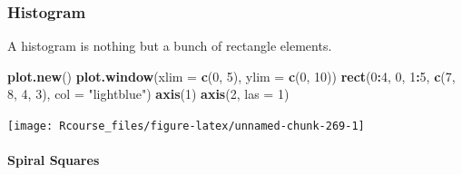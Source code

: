 \documentclass[]{book}
\newenvironment{Shaded}{\begin{snugshade}}{\end{snugshade}}
\newcommand{\DataTypeTok}[1]{\textcolor[rgb]{0.13,0.29,0.53}{#1}}
\newcommand{\DecValTok}[1]{\textcolor[rgb]{0.00,0.00,0.81}{#1}}
\newcommand{\KeywordTok}[1]{\textcolor[rgb]{0.13,0.29,0.53}{\textbf{#1}}}
\newcommand{\NormalTok}[1]{#1}
\newcommand{\OperatorTok}[1]{\textcolor[rgb]{0.81,0.36,0.00}{\textbf{#1}}}
\newcommand{\StringTok}[1]{\textcolor[rgb]{0.31,0.60,0.02}{#1}}
\let\oldparagraph\paragraph
\renewcommand{\paragraph}[1]{\oldparagraph{#1}\mbox{}}
\theoremstyle{definition}
\theoremstyle{definition}
\theoremstyle{definition}
\theoremstyle{remark}
\begin{document}
\hypertarget{histogram}{%
\subsubsection{Histogram}\label{histogram}}

A histogram is nothing but a bunch of rectangle elements.

\begin{Shaded}
\begin{Highlighting}[]
\KeywordTok{plot.new}\NormalTok{()}
\KeywordTok{plot.window}\NormalTok{(}\DataTypeTok{xlim =} \KeywordTok{c}\NormalTok{(}\DecValTok{0}\NormalTok{, }\DecValTok{5}\NormalTok{), }\DataTypeTok{ylim =} \KeywordTok{c}\NormalTok{(}\DecValTok{0}\NormalTok{, }\DecValTok{10}\NormalTok{))}
\KeywordTok{rect}\NormalTok{(}\DecValTok{0}\OperatorTok{:}\DecValTok{4}\NormalTok{, }\DecValTok{0}\NormalTok{, }\DecValTok{1}\OperatorTok{:}\DecValTok{5}\NormalTok{, }\KeywordTok{c}\NormalTok{(}\DecValTok{7}\NormalTok{, }\DecValTok{8}\NormalTok{, }\DecValTok{4}\NormalTok{, }\DecValTok{3}\NormalTok{), }\DataTypeTok{col =} \StringTok{"lightblue"}\NormalTok{)}
\KeywordTok{axis}\NormalTok{(}\DecValTok{1}\NormalTok{)}
\KeywordTok{axis}\NormalTok{(}\DecValTok{2}\NormalTok{, }\DataTypeTok{las =} \DecValTok{1}\NormalTok{)}
\end{Highlighting}
\end{Shaded}

\texttt{[image: Rcourse\_files/figure-latex/unnamed-chunk-269-1]}

\hypertarget{spiral-squares}{%
\paragraph{Spiral Squares}\label{spiral-squares}}
\end{document}
